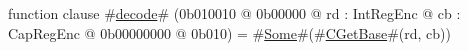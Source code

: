 function clause #\hyperref[sailMIPSzdecode]{decode}# (0b010010 @ 0b00000 @ rd : IntRegEnc @ cb : CapRegEnc @ 0b00000000 @ 0b010) = #\hyperref[sailMIPSzSome]{Some}#(#\hyperref[sailMIPSzCGetBase]{CGetBase}#(rd, cb))
